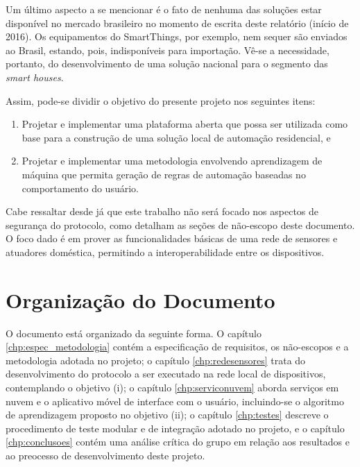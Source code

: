 Um último aspecto a se mencionar é o fato de nenhuma das soluções estar disponível no mercado brasileiro no momento de escrita deste relatório (início de 2016). Os equipamentos do SmartThings, por exemplo, nem sequer são enviados ao Brasil, estando, pois, indisponíveis para importação. Vê-se a necessidade, portanto, do desenvolvimento de uma solução nacional para o segmento das \textit{smart houses}.

Assim, pode-se dividir o objetivo do presente projeto nos seguintes itens:
\begin{enumerate}[\quad (i)]
	\item Projetar e implementar uma plataforma aberta que possa ser utilizada como base para a construção de uma solução local de automação residencial, e
	\item Projetar e implementar uma metodologia envolvendo aprendizagem de máquina que permita geração de regras de automação baseadas no comportamento do usuário.
\end{enumerate}

Cabe ressaltar desde já que este trabalho não será focado nos aspectos de segurança do protocolo, como detalham as seções de não-escopo deste documento. O foco dado é em prover as funcionalidades básicas de uma rede de sensores e atuadores doméstica, permitindo a interoperabilidade entre os dispositivos.

\section{Organização do Documento}
O documento está organizado da seguinte forma. O capítulo \ref{chp:espec_metodologia} contém a especificação de requisitos, os não-escopos e a metodologia adotada no projeto; o capítulo \ref{chp:redesensores} trata do desenvolvimento do protocolo a ser executado na rede local de dispositivos, contemplando o objetivo (i); o capítulo \ref{chp:serviconuvem} aborda serviços em nuvem e o aplicativo móvel de interface com o usuário, incluindo-se o algoritmo de aprendizagem proposto no objetivo (ii); o capítulo \ref{chp:testes} descreve o procedimento de teste modular e de integração adotado no projeto, e o capítulo \ref{chp:conclusoes} contém uma análise crítica do grupo em relação aos resultados e ao preocesso de desenvolvimento deste projeto.